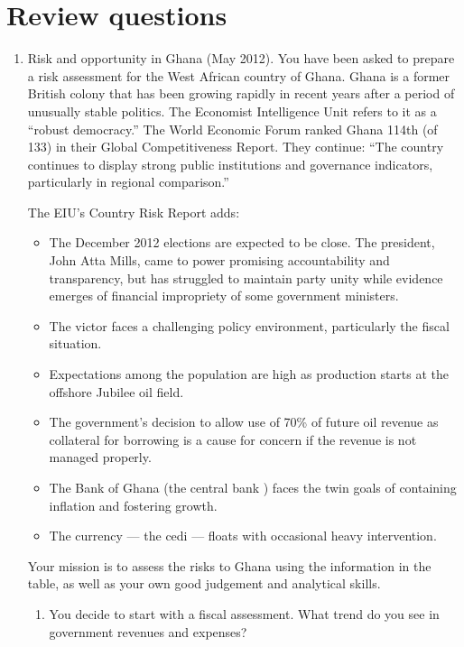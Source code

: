 %

\section*{Review questions}

\setlength{\leftmargini}{.5\oldleftmargini}
\begin{enumerate}
\item Risk and opportunity in Ghana (May 2012).
You have been asked to prepare a risk assessment for
the West African country of Ghana.
Ghana is a former British colony that has been growing rapidly
in recent years after a period of unusually stable politics.
The Economist Intelligence Unit refers to it as a ``robust democracy.''
The World Economic Forum ranked Ghana 114th (of 133)
in their Global Competitiveness Report.
They continue:
``The country continues to display strong public institutions and
governance indicators,
particularly in regional comparison.''

The EIU's Country Risk Report adds: 
\begin{itemize}
\item The December 2012 elections are expected to be close.
The president, John Atta Mills, came to power promising accountability
and transparency, but  has struggled to maintain party unity
while evidence emerges of financial impropriety of some government ministers.
\item The victor faces a challenging policy environment, particularly
the fiscal situation.
\item Expectations among the population are high as production
starts at the offshore Jubilee oil field.
\item The government's decision to allow use of 70\% of future
oil revenue as collateral for borrowing is a cause for concern
if the revenue is not managed properly.
\item The Bank of Ghana (the central bank ) faces the twin goals of
containing inflation and fostering growth.
\item The currency  ---  the cedi --- floats with occasional heavy intervention.
\end{itemize}
%
Your mission is to assess the risks to Ghana  using
the information in the table, as well as
your own good judgement and analytical skills.

\begin{enumerate}
\item  You decide to start with a fiscal assessment.
What trend do you see in government revenues and expenses?


\end{enumerate}
\end{enumerate}
